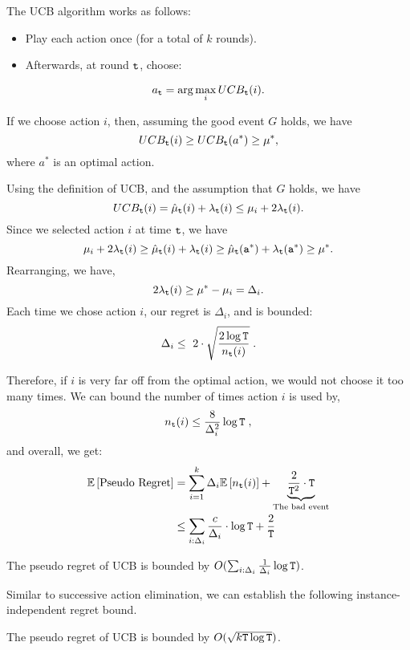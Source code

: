 The UCB  algorithm works as
follows:
\begin{itemize}
\item Play each action once (for a total of $k$ rounds).
\item Afterwards, at round ${\tt t}$, choose:
\end{itemize}
\[
a_{{\tt t}}=\arg\max_{i}UCB_{{\tt t}}(i).
\]


If we choose action $i$, then, assuming the good event $G$ holds, we have
\[
UCB_{{\tt t}}(i)  \ge  UCB_{{\tt t}}(a^*)\geq\mu^{*},
\]
where $a^*$ is an optimal action.

Using the definition of UCB,
and the assumption that $G$ holds, we have
\[
UCB_{{\tt t}}(i)=\hat{\mu}_{{\tt t}}(i)+\lambda_{{\tt t}}(i)\le\mu_{i}+2\lambda_{{\tt t}}(i).
\]
Since we selected action $i$ at time ${\tt t}$, we have
\[
\mu_{i}+2\lambda_{{\tt t}}(i)\ge \hat{\mu}_{\tt t} (i)+\lambda_{{\tt t}}(i)\geq \hat{\mu}_{\tt t} ({\tt a}^*)+\lambda_{{\tt t}}({\tt a}^*)\geq \mu^{*}.
\]
Rearranging, we have,
\[
2\lambda_{{\tt t}}(i)\ge\mu^{*}-\mu_{i}=\Delta_{i}.
\]
Each time we chose action $i$, our regret is $\Delta_i$, and is bounded:
\[
\Delta_{i}\leq\text{ }2\cdot\sqrt{\frac{2\log {\tt T}}{n_{{\tt t}}(i)}}\;.
\]

Therefore, if $i$ is very far off from the optimal action, we
would not choose it too many times. We can bound the number of times
action $i$ is used by,
\[
n_{{\tt t}}(i)\leq\frac{8}{\Delta_{i}^{2}}\log {\tt T}\;,
\]
and overall, we get:
\begin{align*}
\mathbb{E}\left[\text{Pseudo Regret}\right] & =
\sum_{i=1}^{k}\Delta_{i}\mathbb{E}\left[n_{{\tt t}}(i)\right]+\underbrace{\frac{2}{{\tt T}^{2}}\cdot
{\tt T}}_{\text{The bad event}}
\\
 & \le  \sum_{i:\Delta_i}\frac{c}{\Delta_{i}}\cdot\log {\tt T}+\frac{2}{{\tt T}}
\end{align*}

\begin{theorem}
\label{thm:MAB:UCB1}
The pseudo regret of UCB is bounded by $O(\sum_{i:\Delta_i}\frac{1}{\Delta_{i}}\log {\tt T})$.
\end{theorem}

Similar to successive action elimination, we can establish the following instance-independent regret bound. 

\begin{theorem}
\label{thm:MAB:UCB2}
The pseudo regret of UCB is bounded by $O( \sqrt{k{\tt T}\log{\tt T}})$.
\end{theorem}

